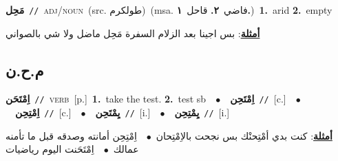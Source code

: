 \documentclass[10pt,a4paper,twoside]{article} %
\begin{document}
\begin{multicols}{2}
{\setlength\topsep{0pt}\textbf{\foreignlanguage{arabic}{مَحِل}}\ {\color{gray}\texttt{//}\color{black}}\ \textsc{adj/noun}\ (src. \color{gray}\foreignlanguage{arabic}{طولكرم}\color{black})\ \color{gray}(msa. \foreignlanguage{arabic}{فاضي}~\foreignlanguage{arabic}{\textbf{٢.}}  \foreignlanguage{arabic}{قاحل}~\foreignlanguage{arabic}{\textbf{١.}})\color{black}\ \textbf{1.}~arid  \textbf{2.}~empty\  \begin{flushright}\color{gray}\foreignlanguage{arabic}{\textbf{\underline{\foreignlanguage{arabic}{أمثلة}}}: بس اجينا بعد الزلام السفرة مَحِل ماضل ولا شي بالصواني}\end{flushright}\color{black}} \vspace{2mm}

\vspace{-3mm}
\subsection*{\color{blue}\foreignlanguage{arabic}{م.ح.ن}\color{blue}{}} 

{\setlength\topsep{0pt}\textbf{\foreignlanguage{arabic}{اِمْتَحَن}}\ {\color{gray}\texttt{//}\color{black}}\ \textsc{verb}\ [p.]\ \textbf{1.}~take the test.  \textbf{2.}~test sb\ \ $\bullet$\ \ \setlength\topsep{0pt}\textbf{\foreignlanguage{arabic}{اِمْتَحِن}}\ {\color{gray}\texttt{//}\color{black}}\ [c.]\ \ $\bullet$\ \ \setlength\topsep{0pt}\textbf{\foreignlanguage{arabic}{اِمْتِحِن}}\ {\color{gray}\texttt{//}\color{black}}\ [c.]\ \ $\bullet$\ \ \setlength\topsep{0pt}\textbf{\foreignlanguage{arabic}{يِمْتَحِن}}\ {\color{gray}\texttt{//}\color{black}}\ [i.]\ \ $\bullet$\ \ \setlength\topsep{0pt}\textbf{\foreignlanguage{arabic}{يِمْتِحِن}}\ {\color{gray}\texttt{//}\color{black}}\ [i.]\  \begin{flushright}\color{gray}\foreignlanguage{arabic}{\textbf{\underline{\foreignlanguage{arabic}{أمثلة}}}: كنت بدي أمْتِحنْك بس نجحت بالاِمْتِحان\ $\bullet$\ \  اِمْتِحِن أمانته وصدقه قبل ما تأمنه عمالك\ $\bullet$\ \  اِمْتَحَنت اليوم رياضيات}\end{flushright}\color{black}} \vspace{2mm}


\end{multicols}
\end{document}
